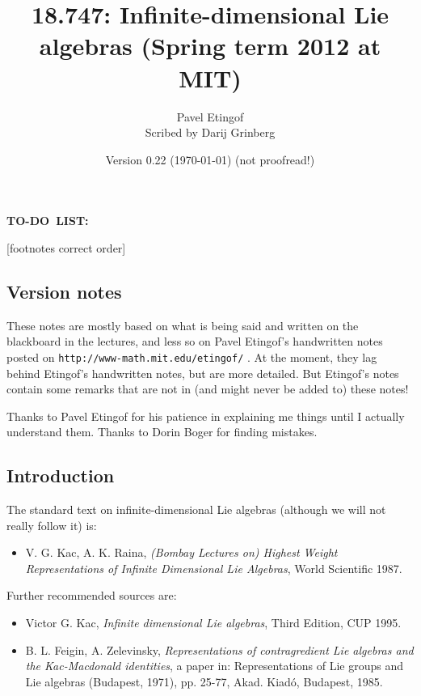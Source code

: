 \documentclass
[numbers=enddot,12pt,final,onecolumn,german,notitlepage]{scrartcl}%
\theoremstyle{definition}
\newenvironment{noncompile}{}{}
\begin{document}
\title{18.747: Infinite-dimensional Lie algebras (Spring term 2012 at MIT)}
\author{Pavel Etingof\\Scribed by Darij Grinberg}
\date{Version 0.22 (\today) (not proofread!)}
\maketitle
\tableofcontents

\begin{noncompile}
\textbf{TO-DO\ LIST:}

[footnotes correct order]
\end{noncompile}

\subsection{Version notes}

These notes are mostly based on what is being said and written on the
blackboard in the lectures, and less so on Pavel Etingof's handwritten notes
posted on \newline\texttt{http://www-math.mit.edu/etingof/} . At
the moment, they lag behind Etingof's handwritten notes, but are more
detailed. But Etingof's notes contain some remarks that are not in (and might
never be added to) these notes!

Thanks to Pavel Etingof for his patience in explaining me things until I
actually understand them. Thanks to Dorin Boger for finding mistakes.

\subsection{Introduction}

The standard text on infinite-dimensional Lie algebras (although we will not
really follow it) is:

\begin{itemize}
\item V. G. Kac, A. K. Raina, \textit{(Bombay Lectures on) Highest Weight
Representations of Infinite Dimensional Lie Algebras}, World Scientific 1987.
\end{itemize}

Further recommended sources are:

\begin{itemize}
\item Victor G. Kac, \textit{Infinite dimensional Lie algebras}, Third
Edition, CUP 1995.

\item B. L. Feigin, A. Zelevinsky, \textit{Representations of contragredient
Lie algebras and the Kac-Macdonald identities}, a paper in: Representations of
Lie groups and Lie algebras (Budapest, 1971), pp. 25-77, Akad. Kiad\'{o},
Budapest, 1985.
\end{itemize}
\end{document}
